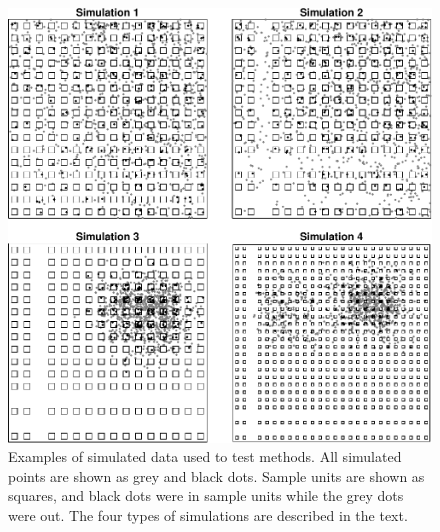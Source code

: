\documentclass[12pt, titlepage]{article}\usepackage[]{graphicx}\usepackage[]{color}
\begin{document}
	\begin{figure}[H]
	\begin{center}
	\includegraphics[width=450pt]{figure/SimAll4Types}
	\end{center}
	\caption{Examples of simulated data used to test methods.  All simulated points are shown as grey and black dots.  Sample units are shown as squares, and black dots were in sample units while the grey dots were out. The four types of simulations are described in the text.\label{fig:SimulationPlots}}
	\end{figure}


\end{document}
